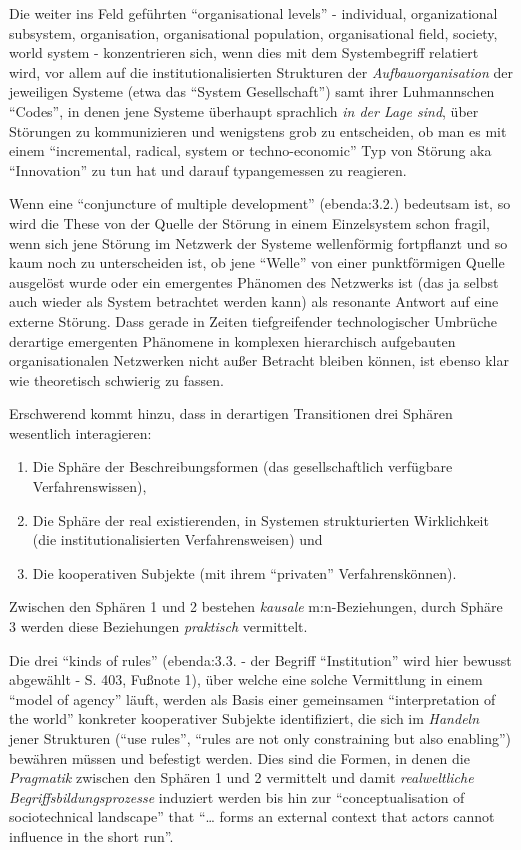 \documentclass[11pt,a4paper]{article}
\begin{document}
Die weiter ins Feld geführten ``organisational levels'' - individual,
organizational subsystem, organisation, organisational population,
organisational field, society, world system - konzentrieren sich, wenn
dies mit dem Systembegriff relatiert wird, vor allem auf die
institutionalisierten Strukturen der \emph{Aufbauorganisation} der
jeweiligen Systeme (etwa das ``System Gesellschaft'') samt ihrer
Luhmannschen ``Codes'', in denen jene Systeme überhaupt sprachlich
\emph{in der Lage sind}, über Störungen zu kommunizieren und wenigstens
grob zu entscheiden, ob man es mit einem ``incremental, radical, system
or techno-economic'' Typ von Störung aka ``Innovation'' zu tun hat und
darauf typangemessen zu reagieren.

Wenn eine ``conjuncture of multiple development'' (ebenda:3.2.)
bedeutsam ist, so wird die These von der Quelle der Störung in einem
Einzelsystem schon fragil, wenn sich jene Störung im Netzwerk der
Systeme wellenförmig fortpflanzt und so kaum noch zu unterscheiden ist,
ob jene ``Welle'' von einer punktförmigen Quelle ausgelöst wurde oder
ein emergentes Phänomen des Netzwerks ist (das ja selbst auch wieder als
System betrachtet werden kann) als resonante Antwort auf eine externe
Störung. Dass gerade in Zeiten tiefgreifender technologischer Umbrüche
derartige emergenten Phänomene in komplexen hierarchisch aufgebauten
organisationalen Netzwerken nicht außer Betracht bleiben können, ist
ebenso klar wie theoretisch schwierig zu fassen.

Erschwerend kommt hinzu, dass in derartigen Transitionen drei Sphären
wesentlich interagieren:

\begin{enumerate}
[noitemsep]
\item
  Die Sphäre der Beschreibungsformen (das gesellschaftlich verfügbare
  Verfahrenswissen),
\item
  Die Sphäre der real existierenden, in Systemen strukturierten
  Wirklichkeit (die institutionalisierten Verfahrensweisen) und
\item
  Die kooperativen Subjekte (mit ihrem ``privaten'' Verfahrenskönnen).
\end{enumerate}

Zwischen den Sphären 1 und 2 bestehen \emph{kausale} m:n-Beziehungen,
durch Sphäre 3 werden diese Beziehungen \emph{praktisch} vermittelt.

Die drei ``kinds of rules'' (ebenda:3.3. - der Begriff ``Institution''
wird hier bewusst abgewählt - S. 403, Fußnote 1), über welche eine
solche Vermittlung in einem ``model of agency'' läuft, werden als Basis
einer gemeinsamen ``interpretation of the world'' konkreter kooperativer
Subjekte identifiziert, die sich im \emph{Handeln} jener Strukturen
(``use rules'', ``rules are not only constraining but also enabling'')
bewähren müssen und befestigt werden. Dies sind die Formen, in denen die
\emph{Pragmatik} zwischen den Sphären 1 und 2 vermittelt und damit
\emph{realweltliche Begriffsbildungsprozesse} induziert werden bis hin
zur ``conceptualisation of sociotechnical landscape'' that ``\ldots{}
forms an external context that actors cannot influence in the short
run''.
\end{document}

